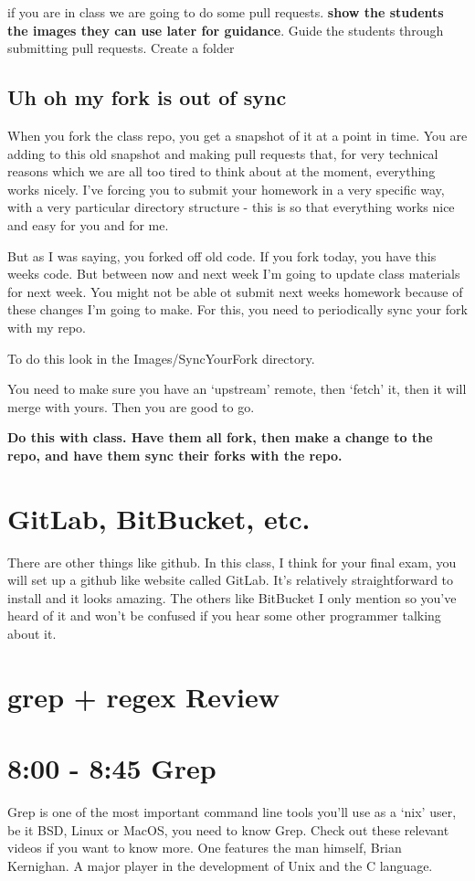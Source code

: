\documentclass[10pt]{article}
\begin{document}
if you are in class we are going to do some pull requests. \textbf{show the
students the images they can use later for guidance}. Guide the students through
submitting pull requests. Create a folder 

\subsection{Uh oh my fork is out of sync}
When you fork the class repo, you get a snapshot of it at a point in time. You
are adding to this old snapshot and making pull requests that, for very
technical reasons which we are all too tired to think about at the moment,
everything works nicely. I've forcing you to submit your homework in a very
specific way, with a very particular directory structure - this is so that
everything works nice and easy for you and for me.

But as  I was saying, you forked off old code. If you fork today, you have this
weeks code. But between now and next week I'm going to update class materials
for next week. You might not be able ot submit next weeks homework because of
these changes I'm going to make. For this, you need to periodically sync your
fork with my repo.

To do this look in the Images/SyncYourFork directory.

You need to make sure you have an `upstream' remote, then `fetch' it, then it
will merge with yours. Then you are good to go. 

\textbf{Do this with class. Have them all fork, then make a change to the repo,
and have them sync their forks with the repo.}


\section{GitLab, BitBucket, etc.}
There are other things like github. In this class, I think for your final exam,
you will set up a github like website called GitLab. It's relatively
straightforward to install and it looks amazing. The others like BitBucket I
only mention so you've heard of it and won't be confused if you hear some other
programmer talking about it.

\section{grep + regex Review}

\section{8:00 - 8:45 Grep}
Grep is one of the most important command line tools you'll use as a `nix' user,
be it BSD, Linux or MacOS, you need to know Grep. Check out these relevant
videos if you want to know more. One features the man himself, Brian
Kernighan. A major player in the development of Unix and the C language.
\end{document}
